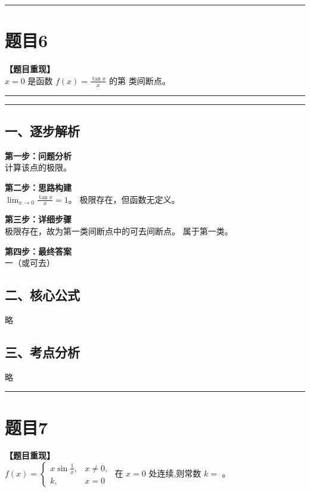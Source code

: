 \documentclass[12pt, a4paper]{ctexart}
\newcommand{\TopSeparator}{
    \par\noindent\rule{\textwidth}{1.5pt}\vspace{0.5em} %
}
\newcommand{\AnalysisSeparator}{
    \par\noindent\rule{\textwidth}{0.5pt}\vspace{0.2em}\hrule\vspace{0.5em} %
}
\newenvironment{RedAnalysis}{
    \par
    \color{red} %
}{
    \par
    \color{black} %
}
\begin{document}
\TopSeparator
\section*{题目6}

\textbf{【题目重现】} \\
$ x = 0 $ 是函数 $ f(x) = \frac{\tan x}{x} $ 的第 \underline{\hspace{1cm}} 类间断点。

\AnalysisSeparator

\begin{RedAnalysis}

\subsection*{一、逐步解析}

\textbf{第一步：问题分析} \\
计算该点的极限。

\textbf{第二步：思路构建} \\
$\lim_{x\to 0} \frac{\tan x}{x} = 1$。
极限存在，但函数无定义。

\textbf{第三步：详细步骤} \\
极限存在，故为第一类间断点中的可去间断点。
属于第一类。

\textbf{第四步：最终答案} \\
一（或可去）

\subsection*{二、核心公式}
略

\subsection*{三、考点分析}
略

\end{RedAnalysis}

\vspace{2em}

\TopSeparator
\section*{题目7}

\textbf{【题目重现】} \\
$ f(x)=\begin{cases}x\sin\frac{1}{x}, & x\neq0,\\ k, & x=0\end{cases} $ 在 $x=0$ 处连续,则常数 $k=$ \underline{\hspace{2cm}}。
\end{document}
